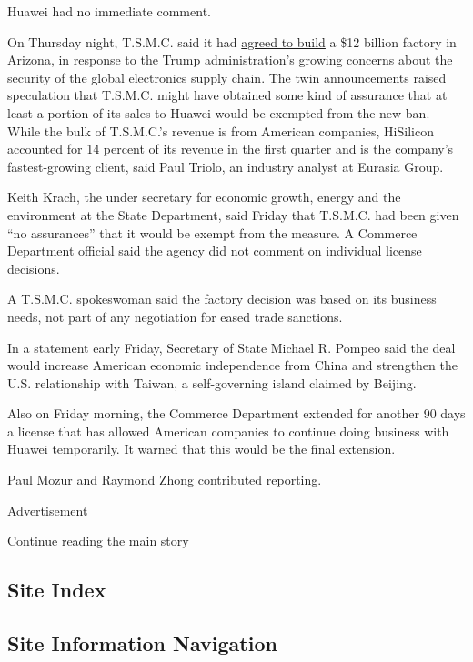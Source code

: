 Huawei had no immediate comment.

On Thursday night, T.S.M.C. said it had
\href{https://www.nytimes3xbfgragh.onion/2020/05/14/technology/trump-tsmc-us-chip-facility.html}{agreed
to build} a \$12 billion factory in Arizona, in response to the Trump
administration's growing concerns about the security of the global
electronics supply chain. The twin announcements raised speculation that
T.S.M.C. might have obtained some kind of assurance that at least a
portion of its sales to Huawei would be exempted from the new ban. While
the bulk of T.S.M.C.'s revenue is from American companies, HiSilicon
accounted for 14 percent of its revenue in the first quarter and is the
company's fastest-growing client, said Paul Triolo, an industry analyst
at Eurasia Group.

Keith Krach, the under secretary for economic growth, energy and the
environment at the State Department, said Friday that T.S.M.C. had been
given ``no assurances'' that it would be exempt from the measure. A
Commerce Department official said the agency did not comment on
individual license decisions.

A T.S.M.C. spokeswoman said the factory decision was based on its
business needs, not part of any negotiation for eased trade sanctions.

In a statement early Friday, Secretary of State Michael R. Pompeo said
the deal would increase American economic independence from China and
strengthen the U.S. relationship with Taiwan, a self-governing island
claimed by Beijing.

Also on Friday morning, the Commerce Department extended for another 90
days a license that has allowed American companies to continue doing
business with Huawei temporarily. It warned that this would be the final
extension.

Paul Mozur and Raymond Zhong contributed reporting.

Advertisement

\protect\hyperlink{after-bottom}{Continue reading the main story}

\hypertarget{site-index}{%
\subsection{Site Index}\label{site-index}}

\hypertarget{site-information-navigation}{%
\subsection{Site Information
Navigation}\label{site-information-navigation}}

